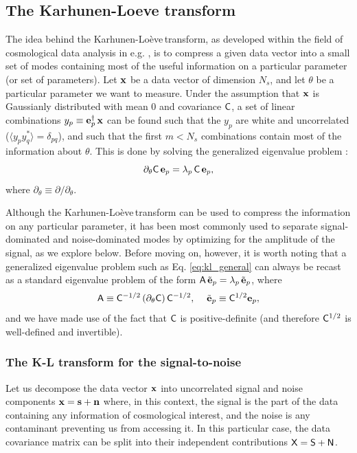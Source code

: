 \documentclass[twocolumn,amsfont,amssymb,amsmath, showpacs,balancelastpage, nofootinbib]{revtex4-1}
\newcommand{\kalo}{Karhunen-Lo\`{e}ve\,}
\begin{document}
  \subsection{The Karhunen-Loeve transform}\label{ssec:method.klbasis}
    The idea behind the \kalo transform, as developed within the field of cosmological data analysis in e.g. \cite{1996ApJ...465...34V,1997ApJ...480...22T}, is to compress a given data vector into a small set of modes containing most of the useful information on a particular parameter (or set of parameters). Let ${\bf x}$ be a data vector of dimension $N_s$, and let $\theta$ be a particular parameter we want to measure. Under the assumption that ${\bf x}$ is Gaussianly distributed with mean 0 and covariance ${\sf C}$, a set of linear combinations $y_p\equiv{\bf e}_p^\dag\,{\bf x}$ can be found such that the $y_p$ are white and uncorrelated ($\langle y_py_q^*\rangle=\delta_{pq}$), and such that the first $m<N_s$ combinations contain most of the information about $\theta$. This is done by solving the generalized eigenvalue problem \cite{1997ApJ...480...22T}:
    \begin{equation}\label{eq:kl_general}
      \partial_\theta{\sf C}\,{\bf e}_p=\lambda_p\,{\sf C}\,{\bf e}_p,
    \end{equation}
    where $\partial_\theta\equiv\partial/\partial_\theta$.
    
    Although the \kalo transform can be used to compress the information on any particular parameter, it has been most commonly used to separate signal-dominated and noise-dominated modes by optimizing for the amplitude of the signal, as we explore below. Before moving on, however, it is worth noting that a generalized eigenvalue problem such as Eq. \ref{eq:kl_general} can always be recast as a standard eigenvalue problem of the form ${\sf A}\,\tilde{\bf e}_p=\lambda_p\,\tilde{\bf e}_p$, where
    \begin{equation}
      {\sf A}\equiv {\sf C}^{-1/2}\,(\partial_\theta{\sf C})\,{\sf C}^{-1/2},\hspace{12pt}
      \tilde{\bf e}_p\equiv{\sf C}^{1/2}{\bf e}_p,
    \end{equation}
    and we have made use of the fact that ${\sf C}$ is positive-definite (and therefore ${\sf C}^{1/2}$ is well-defined and invertible).

    
    \subsubsection{The K-L transform for the signal-to-noise}\label{sssec:method.klbasis.sn}
      Let us decompose the data vector ${\bf x}$ into uncorrelated signal and noise components ${\bf x}={\bf s}+{\bf n}$ where, in this context, the signal is the part of the data containing any information of cosmological interest, and the noise is any contaminant preventing us from accessing it. In this particular case, the data covariance matrix can be split into their independent contributions ${\sf X}={\sf S}+{\sf N}$.
      
\end{document}
